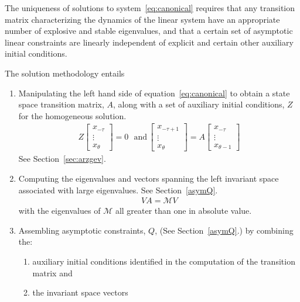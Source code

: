 \documentclass{elsart}
\begin{document}
\label{alg}

\label{sec:basic}

The uniqueness of solutions to 
system~\ref{eq:canonical} requires that
any transition matrix characterizing the dynamics of the 
linear system have an appropriate
number of explosive and stable eigenvalues\cite{blanchard80},
and that a certain set of  asymptotic linear constraints 
are linearly independent of explicit and certain other auxiliary initial 
conditions\cite{ANDER:AIM2}.

The solution methodology entails 
\begin{enumerate}
\item Manipulating the left hand side of equation~\ref{eq:canonical} to obtain
 a state space transition matrix, $A$, along with
a set of auxiliary initial conditions, $Z$ for the homogeneous solution.
\begin{gather}
  Z
  \begin{bmatrix}
    x_{-\tau}\\ \vdots \\ x_{\theta}
  \end{bmatrix}=0 \,\,\,\,\text{and}\,   \begin{bmatrix}
    x_{-\tau+1}\\ \vdots \\ x_{\theta}
  \end{bmatrix}
=A   \begin{bmatrix}
    x_{-\tau}\\ \vdots \\ x_{\theta-1}
  \end{bmatrix}
\end{gather}
See Section~\ref{sec:arzgev}.
\item Computing the eigenvalues and vectors spanning 
the left invariant space associated with
large eigenvalues. See Section~\ref{asymQ}.
\begin{gather}
 V A =   \mathcal{M}  V 
\end{gather}
with the eigenvalues of $ \mathcal{M}$ all greater than one in absolute value.
\item Assembling asymptotic
constraints, $Q$, (See Section~\ref{asymQ}.)  by combining the:
  \begin{enumerate}
\item  auxiliary initial conditions identified in the computation of the transition matrix and 
\item the invariant space vectors
  \end{enumerate}
\begin{gather}

\end{gather}
\end{enumerate}
\end{document}
